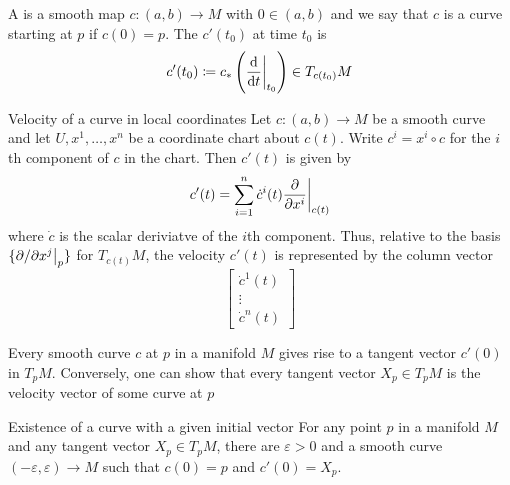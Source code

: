 A  is a smooth map \(c \colon (a,b) \rightarrow M\) with \(0 \in (a,b)\) and we say that \(c\) is a curve starting at \(p\) if \(c(0) = p\).
The  \(c'(t_0)\) at time \(t_0\) is
\[
    c'(t_0) \coloneqq c_* \left( \evalat[\bigg]{\dv{t}}{t_0} \right) \in T_{c(t_0)}M
\]
\begin{proposition}{Velocity of a curve in local coordinates}{}
    Let \(c \colon (a,b) \rightarrow M\) be a smooth curve and let \(U, x^1, \dots, x^n\) be a coordinate chart about \(c(t)\).
    Write \(c^i = x^i \circ c\) for the \(i\)th component of \(c\) in the chart.
    Then \(c'(t)\) is given by
    \[
        c'(t) = \sum_{i=1}^n \dot{c}^i(t) \evalat[\bigg]{\pdv{x^i}}{c(t)}
    \]
    where \(\dot{c}\) is the scalar deriviatve of the \(i\)th component.
    Thus, relative to the basis \(\{\evalat{\prt{}{x^j}}{p}\}\) for \(T_{c(t)}M\), the velocity \(c'(t)\) is represented by the column vector
    \[
        \begin{bmatrix}
            \dot{c}^1(t) \\
            \vdots       \\
            \dot{c}^n(t)
        \end{bmatrix}
    \]
\end{proposition}
Every smooth curve \(c\) at \(p\) in a manifold \(M\) gives rise to a tangent vector \(c'(0)\) in \(T_p M\).
Conversely, one can show that every tangent vector \(X_p \in T_p M\) is the velocity vector of some curve at \(p\)
\begin{proposition}{Existence of a curve with a given initial vector}{}
    For any point \(p\) in a manifold \(M\) and any tangent vector \(X_p \in T_p M\), there are \(\varepsilon > 0\) and a smooth curve \((-\varepsilon, \varepsilon) \rightarrow M\) such that \(c(0) = p\) and \(c'(0) = X_p\).
\end{proposition}
